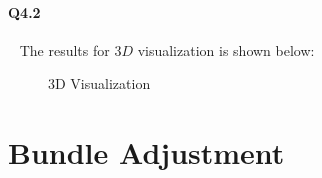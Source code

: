 \documentclass[11pt]{article} \usepackage{fullpage} \usepackage{graphicx} \usepackage{epstopdf} \usepackage{color} \usepackage{psfrag} \usepackage{pdfsync}\usepackage{indentfirst}\usepackage{subfigure}\usepackage{float}\usepackage[section]{placeins}
\begin{document}
\paragraph{Q4.2}~{}
The results for $3D$ visualization is shown below:
\begin{figure}[H]
\centering
{}
\caption{3D Visualization}
\end{figure}

\section{Bundle Adjustment}
\end{document}

